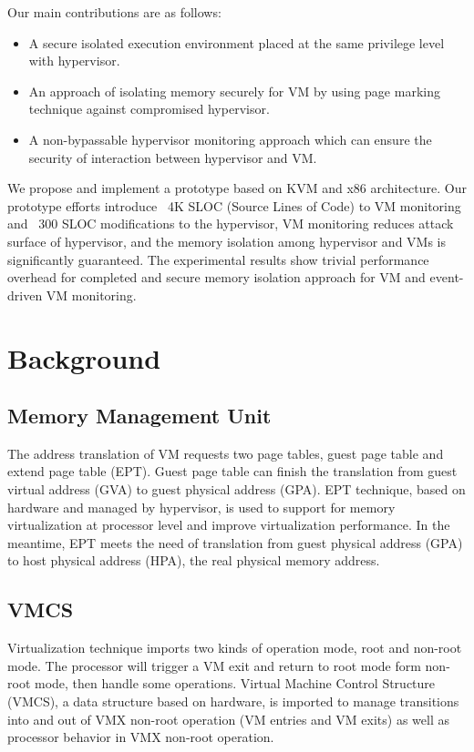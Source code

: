 \documentclass[conference]{IEEEtran}
\begin{document}
Our main contributions are as follows:
\begin{itemize}
\item A secure isolated execution environment placed at the same privilege level with hypervisor.
\item{An approach of isolating memory securely for VM by using page marking technique against compromised hypervisor.}
\item{A non-bypassable hypervisor monitoring approach which can ensure the security of interaction between hypervisor and VM.}
\end{itemize}

We propose and implement a prototype based on KVM and x86 architecture. Our prototype efforts introduce ~4K SLOC (Source Lines of Code) to VM monitoring and ~300 SLOC modifications to the hypervisor, VM monitoring reduces attack surface of hypervisor, and the memory isolation among hypervisor and VMs is significantly guaranteed. The experimental results show trivial performance overhead for completed and secure memory isolation approach for VM and event-driven VM monitoring.


\section{Background}
\subsection{Memory Management Unit}
The address translation of VM requests two page tables, guest page table and extend page table (EPT). Guest page table can finish the translation from guest virtual address (GVA) to guest physical address (GPA). EPT technique, based on hardware and managed by hypervisor, is used to support for memory virtualization at processor level and improve virtualization performance. In the meantime, EPT meets the need of translation from guest physical address (GPA) to host physical address (HPA), the real physical memory address. 

\subsection{VMCS}
Virtualization technique imports two kinds of operation mode, root and non-root mode. The processor will trigger a VM exit and return to root mode form non-root mode, then handle some operations. Virtual Machine Control Structure (VMCS), a data structure based on hardware, is imported to manage transitions into and out of VMX non-root operation (VM entries and VM exits) as well as processor behavior in VMX non-root operation.
\end{document}
